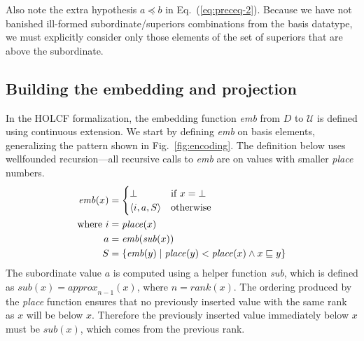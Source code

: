 Also note the extra hypothesis $a \preceq b$ in Eq.~(\ref{eq:preceq-2}). Because we have not banished ill-formed subordinate/superiors combinations from the basis datatype, we must explicitly consider only those elements of the set of superiors that are above the subordinate.

\subsection {Building the embedding and projection}

In the HOLCF formalization, the embedding function \emph{emb} from $D$ to $\mathcal{U}$ is defined using continuous extension. We start by defining \emph{emb} on basis elements, generalizing the pattern shown in Fig.~\ref{fig:encoding}. The definition below uses wellfounded recursion---all recursive calls to \emph{emb} are on values with smaller \emph{place} numbers.
%
\begin{align}
\mathit{emb}(x) & =
\begin{cases}
\bot & \mbox{if}~x = \bot \\
\langle i, a, S \rangle & \mbox{otherwise}
\end{cases} \notag \\
\mbox{where}~i & = \mathit{place}(x) \label{eq:emb} \\
a & = \mathit{emb}(\mathit{sub}(x)) \notag \\
S & = \{\mathit{emb}(y) \mid \mathit{place}(y) < \mathit{place}(x)
\wedge x \sqsubseteq y\} \notag
\end{align}
%
The subordinate value $a$ is computed using a helper function \emph{sub}, which is defined as $\mathit{sub}(x) = \mathit{approx}_{n-1}(x)$, where $n = \mathit{rank}(x)$. The ordering produced by the \emph{place} function ensures that no previously inserted value with the same rank as $x$ will be below $x$. Therefore the previously inserted value immediately below $x$ must be $\mathit{sub}(x)$, which comes from the previous rank.

